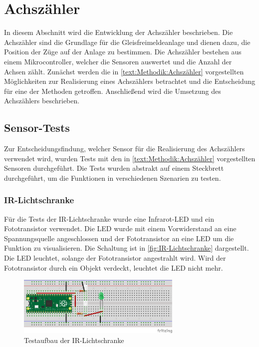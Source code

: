 \section{Achszähler}\label{text:Entwicklung-der-GFA:Achszähler}

In diesem Abschnitt wird die Entwicklung der Achszähler beschrieben. Die Achszähler sind die Grundlage für die Gleisfreimeldeanlage und dienen dazu, die Position der Züge auf der Anlage zu bestimmen. Die Achszähler bestehen aus einem Mikrocontroller, welcher die Sensoren auswertet und die Anzahl der Achsen zählt. Zunächst werden die in \autoref{text:Methodik:Achszähler}  vorgestellten Möglichkeiten zur Realisierung eines Achszählers betrachtet und die Entscheidung für eine der Methoden getroffen. Anschließend wird die Umsetzung des Achszählers beschrieben.

\subsection{Sensor-Tests}\label{text:Entwicklung-der-GFA:Achszähler:Sensor-Tests}

Zur Entscheidungsfindung, welcher Sensor für die Realisierung des Achszählers verwendet wird, wurden Tests mit den in \autoref{text:Methodik:Achszähler}  vorgestellten Sensoren durchgeführt. Die Tests wurden abstrakt auf einem Steckbrett durchgeführt, um die Funktionen in verschiedenen Szenarien zu testen.

\subsubsection{IR-Lichtschranke}\label{text:Entwicklung-der-GFA:Achszähler:Sensor-Tests:Lichtschranke}

Für die Tests der IR-Lichtschranke wurde eine Infrarot-LED und ein Fototransistor verwendet. Die LED wurde mit einem Vorwiderstand an eine Spannungsquelle angeschlossen und der Fototransistor an eine LED um die Funktion zu visualisieren. Die Schaltung ist in \autoref{fig:IR-Lichtschranke} dargestellt. Die LED leuchtet, solange der Fototransistor angestrahlt wird. Wird der Fototransistor durch ein Objekt verdeckt, leuchtet die LED nicht mehr. 

\begin{figure}[H]
    \centering
    \includegraphics[width=0.7\textwidth]{Assets/Images/4-Entwicklung-der-GFA/IR-Test_bb.png}
    \caption{Testaufbau der IR-Lichtschranke}\label{fig:IR-Lichtschranke}
\end{figure}

